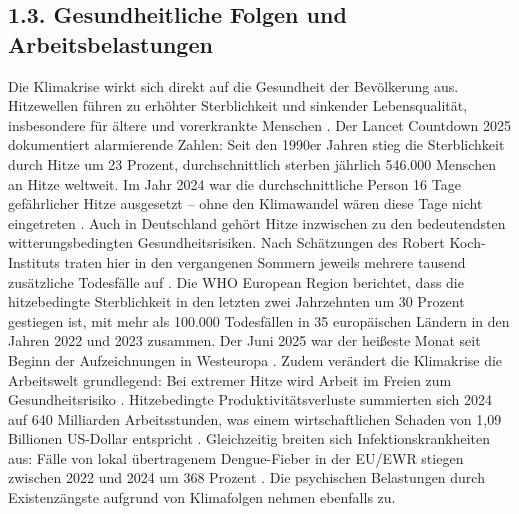 \documentclass[12pt, a4paper]{article}
\begin{document}
	\subsection*{1.3. Gesundheitliche Folgen und Arbeitsbelastungen}
	Die Klimakrise wirkt sich direkt auf die Gesundheit der Bevölkerung aus. Hitzewellen
	führen zu erhöhter Sterblichkeit und sinkender Lebensqualität, insbesondere für
	ältere und vorerkrankte Menschen \cite{rehm2025}. Der Lancet Countdown 2025
	dokumentiert alarmierende Zahlen: Seit den 1990er Jahren stieg die Sterblichkeit durch
	Hitze um 23 Prozent, durchschnittlich sterben jährlich 546.000 Menschen an Hitze
	weltweit. Im Jahr 2024 war die durchschnittliche Person 16 Tage gefährlicher Hitze
	ausgesetzt – ohne den Klimawandel wären diese Tage nicht eingetreten \cite{lancet2025}.
	Auch in Deutschland gehört Hitze inzwischen zu den bedeutendsten witterungsbedingten
	Gesundheitsrisiken. Nach Schätzungen des Robert Koch-Instituts traten hier in den
	vergangenen Sommern jeweils mehrere tausend zusätzliche Todesfälle auf \cite{rki2025}.
	Die WHO European Region berichtet, dass die hitzebedingte Sterblichkeit in den letzten
	zwei Jahrzehnten um 30 Prozent gestiegen ist, mit mehr als 100.000 Todesfällen in
	35 europäischen Ländern in den Jahren 2022 und 2023 zusammen. Der Juni 2025 war der
	heißeste Monat seit Beginn der Aufzeichnungen in Westeuropa \cite{who2025}. Zudem
	verändert die Klimakrise die Arbeitswelt grundlegend: Bei extremer Hitze wird Arbeit
	im Freien zum Gesundheitsrisiko \cite{medienservice2026}. Hitzebedingte
	Produktivitätsverluste summierten sich 2024 auf 640 Milliarden Arbeitsstunden, was
	einem wirtschaftlichen Schaden von 1,09 Billionen US-Dollar entspricht \cite{lancet2025}.
	Gleichzeitig breiten sich Infektionskrankheiten aus: Fälle von lokal übertragenem
	Dengue-Fieber in der EU/EWR stiegen zwischen 2022 und 2024 um 368 Prozent \cite{ecdc2025}.
	Die psychischen Belastungen durch Existenzängste aufgrund von Klimafolgen nehmen
	ebenfalls zu.
	
\end{document}

